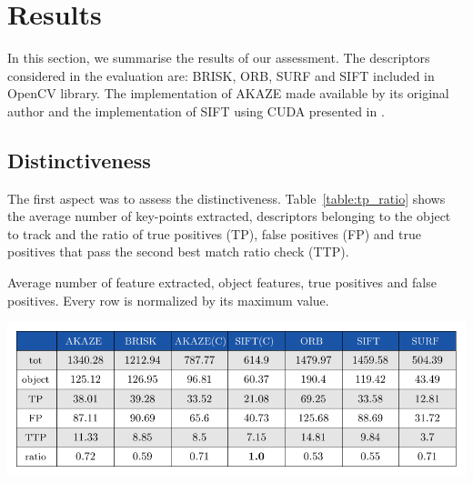 \section{Results}

In this section, we summarise the results of our assessment. The descriptors considered in the evaluation are: BRISK, ORB, SURF and SIFT included in OpenCV library. The implementation of AKAZE made available by its original author \cite{alcantarilla13} and the implementation of SIFT using CUDA presented in \cite{bjorkmann14}.

\subsection{Distinctiveness}


The first aspect was to assess the distinctiveness. Table~\ref{table:tp_ratio} shows the average number of key-points extracted, descriptors belonging to the object to track and the ratio of true positives (TP), false positives (FP) and true positives that pass the second best match ratio check (TTP). 

\begin{table}[!h]
\caption{Average number of feature extracted, object features, true positives and false positives. Every row is normalized by its maximum value.}
\vspace{-2mm} 
\centerline{%
		\includegraphics[width=0.98\linewidth]{tables/descriptivness_ratio_raw.pdf}}
    \vspace{-2mm} 
	\label{table:tp_ratio}
\end{table}

